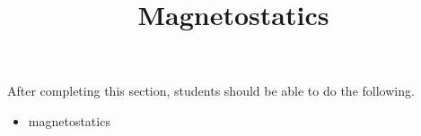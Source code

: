 \documentclass{ximera}
\title{Magnetostatics}
\begin{document}
\begin{abstract}
\end{abstract}

\maketitle

\begin{sectionOutcomes}

After completing this section, students should be able to do the following.

\begin{itemize}
\item magnetostatics
\end{itemize}

\end{sectionOutcomes}
\end{document}
